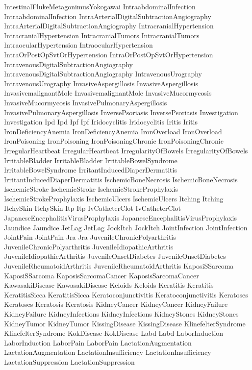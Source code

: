  IntestinalFlukeMetagonimusYokogawai
 IntraabdominalInfection
 IntraabdominalInfection
 IntraArterialDigitalSubtractionAngiography
 IntraArterialDigitalSubtractionAngiography
 IntracranialHypertension
 IntracranialHypertension
 IntracranialTumors
 IntracranialTumors
 IntraocularHypertension
 IntraocularHypertension
 IntraOrPostOpSvtOrHypertension
 IntraOrPostOpSvtOrHypertension
 IntravenousDigitalSubtractionAngiography
 IntravenousDigitalSubtractionAngiography
 IntravenousUrography
 IntravenousUrography
 InvasiveAspergillosis
 InvasiveAspergillosis
 InvasivemalignantMole
 InvasivemalignantMole
 InvasiveMucormycosis
 InvasiveMucormycosis
 InvasivePulmonaryAspergillosis
 InvasivePulmonaryAspergillosis
 InversePsoriasis
 InversePsoriasis
 Investigation
 Investigation
 Ipd
 Ipd
 Ipf
 Ipf
 Iridocyclitis
 Iridocyclitis
 Iritis
 Iritis
 IronDeficiencyAnemia
 IronDeficiencyAnemia
 IronOverload
 IronOverload
 IronPoisoning
 IronPoisoning
 IronPoisoningChronic
 IronPoisoningChronic
 IrregularHeartbeat
 IrregularHeartbeat
 IrregularityOfBowels
 IrregularityOfBowels
 IrritableBladder
 IrritableBladder
 IrritableBowelSyndrome
 IrritableBowelSyndrome
 IrritantInducedDiaperDermatitis
 IrritantInducedDiaperDermatitis
 IschemicBoneNecrosis
 IschemicBoneNecrosis
 IschemicStroke
 IschemicStroke
 IschemicStrokeProphylaxis
 IschemicStrokeProphylaxis
 IschemicUlcers
 IschemicUlcers
 Itching
 Itching
 ItchySkin
 ItchySkin
 Itp
 Itp
 IvCatheterClot
 IvCatheterClot
 JapaneseEncephalitisVirusProphylaxis
 JapaneseEncephalitisVirusProphylaxis
 Jaundice
 Jaundice
 JetLag
 JetLag
 JockItch
 JockItch
 JointInfection
 JointInfection
 JointPain
 JointPain
 Jra
 Jra
 JuvenileChronicPolyarthritis
 JuvenileChronicPolyarthritis
 JuvenileIdiopathicArthritis
 JuvenileIdiopathicArthritis
 JuvenileOnsetDiabetes
 JuvenileOnsetDiabetes
 JuvenileRheumatoidArthritis
 JuvenileRheumatoidArthritis
 KaposiSSarcoma
 KaposiSSarcoma
 KaposisSarcomaCancer
 KaposisSarcomaCancer
 KawasakiDisease
 KawasakiDisease
 Keloids
 Keloids
 Keratitis
 Keratitis
 KeratitisSicca
 KeratitisSicca
 Keratoconjunctivitis
 Keratoconjunctivitis
 Keratoses
 Keratoses
 Keratosis
 Keratosis
 KidneyCancer
 KidneyCancer
 KidneyFailure
 KidneyFailure
 KidneyInfections
 KidneyInfections
 KidneyStones
 KidneyStones
 KidneyTumor
 KidneyTumor
 KissingDisease
 KissingDisease
 KlinefelterSyndrome
 KlinefelterSyndrome
 KokDisease
 KokDisease
 Labd
 Labd
 LaborInduction
 LaborInduction
 LaborPain
 LaborPain
 LactationAugmentation
 LactationAugmentation
 LactationInsufficiency
 LactationInsufficiency
 LactationSuppression
 LactationSuppression
